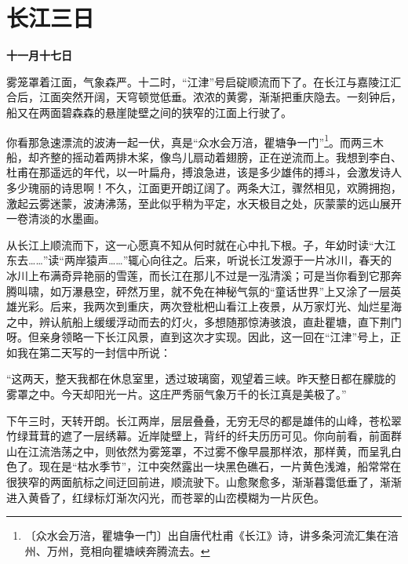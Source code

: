 \documentclass[12pt,UTF-8,openany]{ctexbook}
\begin{document}
\chapter{长江三日}

\begin{normalsize}
    
    \textbf{十一月十七日}
    
    雾笼罩着江面，气象森严。十二时，“江津”号启碇顺流而下了。在长江与嘉陵江汇合后，江面突然开阔，天穹顿觉低垂。浓浓的黄雾，渐渐把重庆隐去。一刻钟后，船又在两面碧森森的悬崖陡壁之间的狭窄的江面上行驶了。
    
    你看那急速漂流的波涛一起一伏，真是“众水会万涪，瞿塘争一门”\footnote{〔众水会万涪，瞿塘争一门〕出自唐代杜甫《长江》诗，讲多条河流汇集在涪州、万州，竞相向瞿塘峡奔腾流去。}。而两三木船，却齐整的摇动着两排木桨，像鸟儿扇动着翅膀，正在逆流而上。我想到李白、杜甫在那遥远的年代，以一叶扁舟，搏浪急进，该是多少雄伟的搏斗，会激发诗人多少瑰丽的诗思啊！不久，江面更开朗辽阔了。两条大江，骤然相见，欢腾拥抱，激起云雾迷蒙，波涛沸荡，至此似乎稍为平定，水天极目之处，灰蒙蒙的远山展开一卷清淡的水墨画。
    
    从长江上顺流而下，这一心愿真不知从何时就在心中扎下根。子，年幼时读“大江东去……”读“两岸猿声……”辄心向往之。后来，听说长江发源于一片冰川，春天的冰川上布满奇异艳丽的雪莲，而长江在那儿不过是一泓清溪；可是当你看到它那奔腾叫啸，如万瀑悬空，砰然万里，就不免在神秘气氛的“童话世界”上又涂了一层英雄光彩。后来，我两次到重庆，两次登枇杷山看江上夜景，从万家灯光、灿烂星海之中，辨认航船上缓缓浮动而去的灯火，多想随那惊涛骇浪，直赴瞿塘，直下荆门呀。但亲身领略一下长江风景，直到这次才实现。因此，这一回在“江津”号上，正如我在第二天写的一封信中所说：
    
    “这两天，整天我都在休息室里，透过玻璃窗，观望着三峡。昨天整日都在朦胧的雾罩之中。今天却阳光一片。这庄严秀丽气象万千的长江真是美极了。”
    
    下午三时，天转开朗。长江两岸，层层叠叠，无穷无尽的都是雄伟的山峰，苍松翠竹绿茸茸的遮了一层绣幕。近岸陡壁上，背纤的纤夫历历可见。你向前看，前面群山在江流浩荡之中，则依然为雾笼罩，不过雾不像早晨那样浓，那样黄，而呈乳白色了。现在是“枯水季节”，江中突然露出一块黑色礁石，一片黄色浅滩，船常常在很狭窄的两面航标之间迂回前进，顺流驶下。山愈聚愈多，渐渐暮霭低垂了，渐渐进入黄昏了，红绿标灯渐次闪光，而苍翠的山峦模糊为一片灰色。
    

\end{normalsize}
\end{document}

